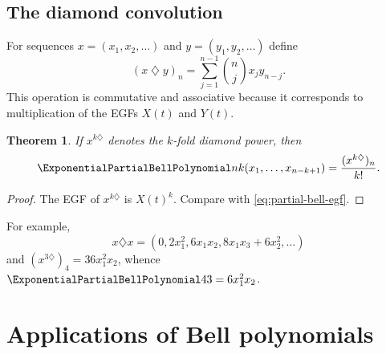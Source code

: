 \documentclass[11pt,a4paper,oneside,openany]{book}
\newtheorem{theorem}{Theorem}[chapter]
\theoremstyle{definition}
\theoremstyle{remark}
\begin{document}
\section{The diamond convolution}
For sequences $x=(x_1,x_2,\ldots)$ and $y=(y_1,y_2,\ldots)$ define
\begin{equation}\label{eq:diamond}
 (x\mathbin\diamondsuit y)_n=\sum_{j=1}^{n-1}\binom njx_jy_{n-j}.
\end{equation}
This operation is commutative and associative because it corresponds to
multiplication of the EGFs $X(t)$ and $Y(t)$.

\begin{theorem}\label{thm:diamond-bell}
If $x^{k\diamondsuit}$ denotes the $k$-fold diamond power, then
\begin{equation}\label{eq:diamond-bell}
 \ExponentialPartialBellPolynomial nk(x_1,\ldots,x_{n-k+1})=\frac{(x^{k\diamondsuit})_n}{k!}.
\end{equation}
\end{theorem}
\begin{proof}
The EGF of $x^{k\diamondsuit}$ is $X(t)^k$.  Compare with
\eqref{eq:partial-bell-egf}.
\end{proof}
For example,
\[
 x\diamondsuit x=(0,2x_1^2,6x_1x_2,8x_1x_3+6x_2^2,\ldots)
\]
and
$(x^{3\diamondsuit})_4=36x_1^2x_2$, whence
$\ExponentialPartialBellPolynomial43=6x_1^2x_2$.

\chapter{Applications of Bell polynomials}
\end{document}
